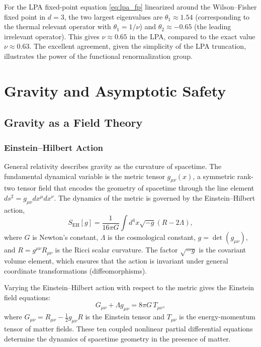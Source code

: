 \documentclass[11pt, twoside, openright]{book}
\theoremstyle{dotted}
\theoremstyle{definition}
\begin{document}
For the LPA fixed-point equation \eqref{eq:lpa_fp} linearized around the Wilson--Fisher
fixed point in $d = 3$, the two largest eigenvalues are $\theta_1 \approx 1.54$
(corresponding to the thermal relevant operator with $\theta_1 = 1/\nu$) and
$\theta_2 \approx -0.65$ (the leading irrelevant operator). This gives $\nu \approx
0.65$ in the LPA, compared to the exact value $\nu \approx 0.63$. The excellent
agreement, given the simplicity of the LPA truncation, illustrates the power of the
functional renormalization group.

\part{Gravity and Asymptotic Safety}

\chapter{Gravity as a Field Theory}
\label{ch:gravity_ft}

\section{Einstein--Hilbert Action}

General relativity describes gravity as the curvature of spacetime. The fundamental
dynamical variable is the metric tensor $g_{\mu\nu}(x)$, a symmetric rank-two tensor
field that encodes the geometry of spacetime through the line element
$ds^2 = g_{\mu\nu}dx^\mu dx^\nu$. The dynamics of the metric is governed by the
Einstein--Hilbert action,
\begin{equation}
  S_{\mathrm{EH}}[g] = \frac{1}{16\pi G}\int d^4x \sqrt{-g}(R - 2\Lambda),
  \label{eq:EH_action}
\end{equation}
where $G$ is Newton's constant, $\Lambda$ is the cosmological constant, $g = \det(g_{\mu\nu})$,
and $R = g^{\mu\nu}R_{\mu\nu}$ is the Ricci scalar curvature. The factor
$\sqrt{-g}$ is the covariant volume element, which ensures that the action is
invariant under general coordinate transformations (diffeomorphisms).

Varying the Einstein--Hilbert action with respect to the metric gives the Einstein
field equations:
\begin{equation}
  G_{\mu\nu} + \Lambda g_{\mu\nu} = 8\pi G \, T_{\mu\nu},
  \label{eq:einstein_equations}
\end{equation}
where $G_{\mu\nu} = R_{\mu\nu} - \frac{1}{2}g_{\mu\nu}R$ is the Einstein tensor
and $T_{\mu\nu}$ is the energy-momentum tensor of matter fields. These ten coupled
nonlinear partial differential equations determine the dynamics of spacetime geometry
in the presence of matter.
\end{document}
